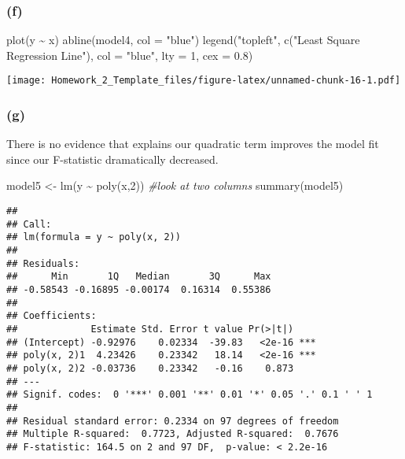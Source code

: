 \documentclass[
]{article}
\newenvironment{Shaded}{\begin{snugshade}}{\end{snugshade}}
\newcommand{\AttributeTok}[1]{\textcolor[rgb]{0.77,0.63,0.00}{#1}}
\newcommand{\CommentTok}[1]{\textcolor[rgb]{0.56,0.35,0.01}{\textit{#1}}}
\newcommand{\DecValTok}[1]{\textcolor[rgb]{0.00,0.00,0.81}{#1}}
\newcommand{\FloatTok}[1]{\textcolor[rgb]{0.00,0.00,0.81}{#1}}
\newcommand{\FunctionTok}[1]{\textcolor[rgb]{0.00,0.00,0.00}{#1}}
\newcommand{\NormalTok}[1]{#1}
\newcommand{\OtherTok}[1]{\textcolor[rgb]{0.56,0.35,0.01}{#1}}
\newcommand{\SpecialCharTok}[1]{\textcolor[rgb]{0.00,0.00,0.00}{#1}}
\newcommand{\StringTok}[1]{\textcolor[rgb]{0.31,0.60,0.02}{#1}}
\begin{document}
\hypertarget{f-2}{%
\subsubsection{(f)}\label{f-2}}

\begin{Shaded}
\begin{Highlighting}[]
\FunctionTok{plot}\NormalTok{(y }\SpecialCharTok{\textasciitilde{}}\NormalTok{ x)}
\FunctionTok{abline}\NormalTok{(model4, }\AttributeTok{col =} \StringTok{"blue"}\NormalTok{)}
\FunctionTok{legend}\NormalTok{(}\StringTok{"topleft"}\NormalTok{, }\FunctionTok{c}\NormalTok{(}\StringTok{"Least Square Regression Line"}\NormalTok{), }\AttributeTok{col =} \StringTok{"blue"}\NormalTok{, }\AttributeTok{lty =} \DecValTok{1}\NormalTok{, }\AttributeTok{cex =} \FloatTok{0.8}\NormalTok{)}
\end{Highlighting}
\end{Shaded}

\texttt{[image: Homework\_2\_Template\_files/figure-latex/unnamed-chunk-16-1.pdf]}

\hypertarget{g}{%
\subsubsection{(g)}\label{g}}

There is no evidence that explains our quadratic term improves the model
fit since our F-statistic dramatically decreased.

\begin{Shaded}
\begin{Highlighting}[]
\NormalTok{model5 }\OtherTok{\textless{}{-}} \FunctionTok{lm}\NormalTok{(y }\SpecialCharTok{\textasciitilde{}} \FunctionTok{poly}\NormalTok{(x,}\DecValTok{2}\NormalTok{)) }\CommentTok{\#look at two columns}
\FunctionTok{summary}\NormalTok{(model5)}
\end{Highlighting}
\end{Shaded}

\begin{verbatim}
## 
## Call:
## lm(formula = y ~ poly(x, 2))
## 
## Residuals:
##      Min       1Q   Median       3Q      Max 
## -0.58543 -0.16895 -0.00174  0.16314  0.55386 
## 
## Coefficients:
##             Estimate Std. Error t value Pr(>|t|)    
## (Intercept) -0.92976    0.02334  -39.83   <2e-16 ***
## poly(x, 2)1  4.23426    0.23342   18.14   <2e-16 ***
## poly(x, 2)2 -0.03736    0.23342   -0.16    0.873    
## ---
## Signif. codes:  0 '***' 0.001 '**' 0.01 '*' 0.05 '.' 0.1 ' ' 1
## 
## Residual standard error: 0.2334 on 97 degrees of freedom
## Multiple R-squared:  0.7723, Adjusted R-squared:  0.7676 
## F-statistic: 164.5 on 2 and 97 DF,  p-value: < 2.2e-16
\end{verbatim}
\end{document}
